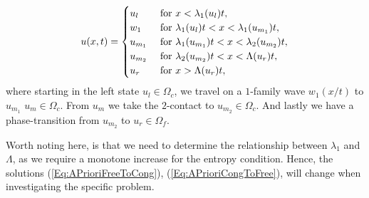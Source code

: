 \documentclass[10pt]{article}
\numberwithin{equation}{section}
\begin{document}
\begin{align}
    u(x,t) = \begin{cases}
        u_l & \text{ for $ x < \lambda_1(u_l)t$}, \\
        w_1 & \text{ for $ \lambda_1(u_l)t < x < \lambda_1(u_{m_1})t$}, \\
        u_{m_1} & \text{ for $ \lambda_1(u_{m_1})t < x < \lambda_2(u_{m_2})t$}, \\
        u_{m_2} & \text{ for $ \lambda_2(u_{m_2})t < x < \Lambda( u_r)t $}, \\
        u_r & \text{ for $x > \Lambda( u_r)t$},
    \end{cases}
    \label{Eq:APrioriCongToFree}
\end{align}
where starting in the left state $u_l \in \Omega_c$, we travel on a $1$-family wave $w_1(x/t)$ to $u_{m_1}$ $u_m \in \Omega_c$. From $u_m$ we take the $2$-contact to $u_{m_2} \in \Omega_c$. And lastly we have a phase-transition from $u_{m_2}$ to $u_r \in \Omega_f$. 

Worth noting here, is that we need to determine the relationship between $\lambda_1$ and $\Lambda$, as we require a monotone increase for the entropy condition. Hence, the solutions (\ref{Eq:APrioriFreeToCong}), (\ref{Eq:APrioriCongToFree}), will change when investigating the specific problem. 
\end{document}
